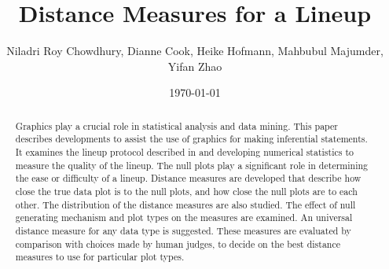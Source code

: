 \documentclass[12]{article}
\begin{document}
\title{Distance Measures for a Lineup}
\author{Niladri Roy Chowdhury, Dianne Cook, Heike Hofmann, Mahbubul Majumder, Yifan Zhao}
\date{\today}  %
\maketitle

\begin {abstract} 
Graphics play a crucial role in statistical analysis and data mining. This paper describes developments to assist the use of graphics for making inferential statements. It examines the lineup protocol described in \citet{buja:2009}  and \cite{majumder:2011} developing numerical statistics to measure the quality of the lineup. The null plots play a significant role in determining the ease or difficulty of a lineup. Distance measures are developed that describe how close the true data plot is to the null plots, and how close the null plots are to each other. The distribution of the distance measures are also studied. The effect of null generating mechanism and plot types on the measures are examined. An universal distance measure for any data type is suggested. These measures are evaluated by comparison with choices made by human judges, to decide on the best distance measures to use for particular plot types.

\end {abstract}


\end{document}
